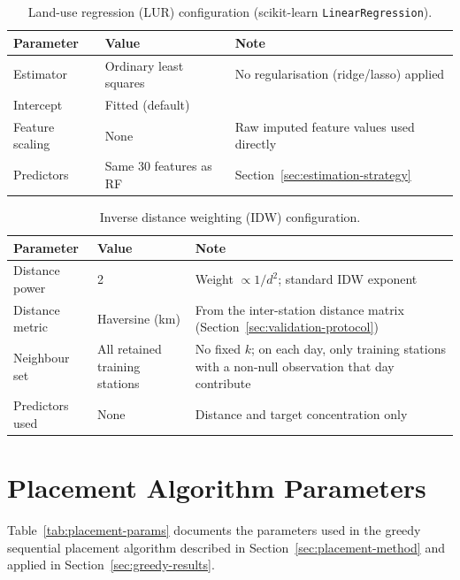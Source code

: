 \documentclass[11pt,a4paper]{article}
\let\oldsection\section
\renewcommand{\section}{\FloatBarrier\oldsection}
\begin{document}
\begin{table}[ht]
\centering
\caption{Land-use regression (LUR) configuration (scikit-learn \texttt{LinearRegression}).}
\label{tab:lur-params}
\small
\begin{tabular}{p{4.5cm}p{2.5cm}p{6.5cm}}
\toprule
\textbf{Parameter} & \textbf{Value} & \textbf{Note} \\
\midrule
Estimator & Ordinary least squares & No regularisation (ridge/lasso) applied \\
Intercept & Fitted (default) & \\
Feature scaling & None & Raw imputed feature values used directly \\
Predictors & Same 30 features as RF & Section~\ref{sec:estimation-strategy} \\
\bottomrule
\end{tabular}
\end{table}

\begin{table}[ht]
\centering
\caption{Inverse distance weighting (IDW) configuration.}
\label{tab:idw-params}
\small
\begin{tabular}{p{4.5cm}p{2.5cm}p{6.5cm}}
\toprule
\textbf{Parameter} & \textbf{Value} & \textbf{Note} \\
\midrule
Distance power & 2 & Weight $\propto 1/d^2$; standard IDW exponent \\
Distance metric & Haversine (km) & From the inter-station distance matrix (Section~\ref{sec:validation-protocol}) \\
Neighbour set & All retained training stations & No fixed $k$; on each day, only training stations with a non-null observation that day contribute \\
Predictors used & None & Distance and target concentration only \\
\bottomrule
\end{tabular}
\end{table}

\section{Placement Algorithm Parameters}
\label{app:placement-params}

Table~\ref{tab:placement-params} documents the parameters used in the greedy sequential placement algorithm described in Section~\ref{sec:placement-method} and applied in Section~\ref{sec:greedy-results}.
\end{document}
